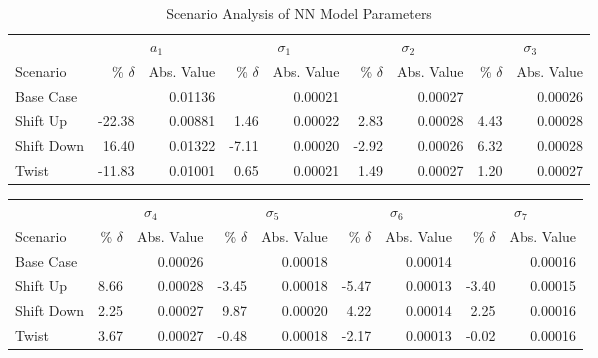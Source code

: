 \begin{table}[H]
  \centering
  \setlength{\tabcolsep}{5pt} 
  \caption{Scenario Analysis of NN Model Parameters}
  \label{tab:scenario_analysis_part_nn}
  \begin{threeparttable}
    \begin{tabular}{l *{4}{rr}}
      \toprule
      & \multicolumn{2}{c}{$a_1$} & \multicolumn{2}{c}{$\sigma_1$} & \multicolumn{2}{c}{$\sigma_2$} & \multicolumn{2}{c}{$\sigma_3$} \\
      \cmidrule(lr){2-3} \cmidrule(lr){4-5} \cmidrule(lr){6-7} \cmidrule(lr){8-9}
      Scenario & \% $\delta$ & Abs. Value & \% $\delta$ & Abs. Value & \% $\delta$ & Abs. Value & \% $\delta$ & Abs. Value \\
      \midrule
      
      Base Case    &           & 0.01136 &           & 0.00021 &           & 0.00027 &           & 0.00026 \\
      Shift Up     &  -22.38   & 0.00881 &    1.46   & 0.00022 &    2.83   & 0.00028 &    4.43   & 0.00028 \\
      Shift Down   &   16.40   & 0.01322 &   -7.11   & 0.00020 &   -2.92   & 0.00026 &    6.32   & 0.00028 \\
      Twist        &  -11.83   & 0.01001 &    0.65   & 0.00021 &    1.49   & 0.00027 &    1.20   & 0.00027 \\
      \bottomrule
    \end{tabular}
  \end{threeparttable}
\end{table}

\begin{table}[H]
  \centering
  \setlength{\tabcolsep}{5pt}
  \begin{threeparttable}
    \begin{tabular}{l *{4}{rr}}
      & \multicolumn{2}{c}{$\sigma_4$} & \multicolumn{2}{c}{$\sigma_5$} & \multicolumn{2}{c}{$\sigma_6$} & \multicolumn{2}{c}{$\sigma_7$} \\
      \cmidrule(lr){2-3} \cmidrule(lr){4-5} \cmidrule(lr){6-7} \cmidrule(lr){8-9}
      Scenario & \% $\delta$ & Abs. Value & \% $\delta$ & Abs. Value & \% $\delta$ & Abs. Value & \% $\delta$ & Abs. Value \\
      \midrule
      
      Base Case    &           & 0.00026 &           & 0.00018 &           & 0.00014 &           & 0.00016 \\
      Shift Up     &    8.66   & 0.00028 &   -3.45   & 0.00018 &   -5.47   & 0.00013 &   -3.40   & 0.00015 \\
      Shift Down   &    2.25   & 0.00027 &    9.87   & 0.00020 &    4.22   & 0.00014 &    2.25   & 0.00016 \\
      Twist        &    3.67   & 0.00027 &   -0.48   & 0.00018 &   -2.17   & 0.00013 &   -0.02   & 0.00016 \\
      \bottomrule
    \end{tabular}
  \end{threeparttable}
\end{table}

